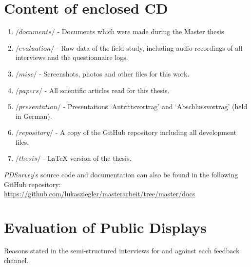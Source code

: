\section{Content of enclosed CD}
\label{appendix:cd-contents}


    \begin{enumerate}
    \item $/documents/$ - Documents which were made during the Master thesis
    \item $/evaluation/$ - Raw data of the field study, including audio recordings of all interviews and the questionnaire logs.

    \item $/misc/$ - Screenshots, photos and other files for this work.
    \item $/papers/$ - All scientific articles read for this thesis.
    \item $/presentation/$ - Presentations `Antrittsvortrag' and `Abschlussvortrag' (held in German).

    \item $/repository/$ - A copy of the GitHub repository including all development files.

    \item $/thesis/$ - LaTeX version of the thesis.

    \end{enumerate}

  \textit{PDSurvey}'s source code and documentation can also be found in the following GitHub repository: \url{https://github.com/lukasziegler/masterarbeit/tree/master/docs}



\cleardoublepage
\section{Evaluation of Public Displays}
\label{appendix:evaluation-of-PDs}

  Reasons stated in the semi-structured interviews for and against each feedback channel. \\


      



\clearpage

\label{appendix:interviews}

  
  \label{appendix:interview-participant}

